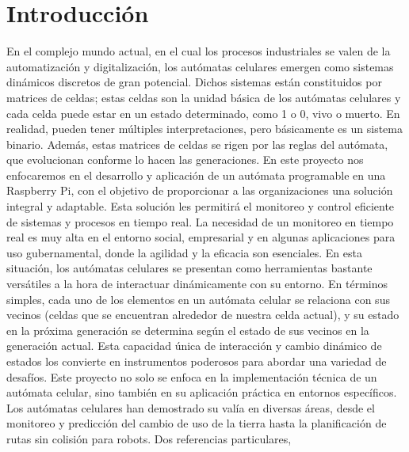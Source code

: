 \section{Introducci\'on}
\label{sec:introduccion}
    En el complejo mundo actual, en el cual los procesos industriales se valen de la automatizaci\'on y digitalizaci\'on, 
        los aut\'omatas celulares emergen como sistemas din\'amicos discretos de gran potencial. Dichos sistemas est\'an 
        constituidos por matrices de celdas; estas celdas son la unidad b\'asica de los aut\'omatas celulares y cada celda 
        puede estar en un estado determinado, como 1 o 0, vivo o muerto. En realidad, pueden tener m\'ultiples 
        interpretaciones, pero b\'asicamente es un sistema binario. Adem\'as, estas matrices de celdas se rigen 
        por las reglas del aut\'omata, que evolucionan conforme lo hacen las generaciones. En este proyecto nos 
        enfocaremos en el desarrollo y aplicaci\'on de un aut\'omata programable en una Raspberry Pi, con el objetivo 
        de proporcionar a las organizaciones una soluci\'on integral y adaptable. Esta soluci\'on les permitir\'a el 
        monitoreo y control eficiente de sistemas y procesos en tiempo real.
    \vskip 0.5cm
    La necesidad de un monitoreo en tiempo real es muy alta en el entorno social, empresarial y en algunas 
        aplicaciones para uso gubernamental, donde la agilidad y la eficacia son esenciales. En esta situaci\'on, 
        los aut\'omatas celulares se presentan como herramientas bastante vers\'atiles a la hora de interactuar 
        din\'amicamente con su entorno. En t\'erminos simples, cada uno de los elementos en un aut\'omata celular se 
        relaciona con sus vecinos (celdas que se encuentran alrededor de nuestra celda actual), y su estado en 
        la pr\'oxima generaci\'on se determina seg\'un el estado de sus vecinos en la generaci\'on actual. Esta capacidad 
        \'unica de interacci\'on y cambio din\'amico de estados los convierte en instrumentos poderosos para abordar una
        variedad de desaf\'ios.
    \vskip 0.5cm
    Este proyecto no solo se enfoca en la implementaci\'on t\'ecnica de un aut\'omata celular, sino tambi\'en 
        en su aplicaci\'on pr\'actica en entornos espec\'ificos. Los aut\'omatas celulares han demostrado su 
        val\'ia en diversas \'areas, desde el monitoreo y predicci\'on del cambio de uso de la tierra hasta 
        la planificaci\'on de rutas sin colisi\'on para robots. Dos referencias particulares, \cite{Tzionas1997} 
